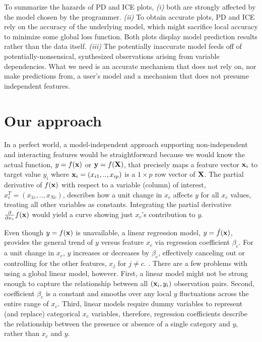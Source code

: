 \documentclass[12pt]{article}
\newcommand{\cut}[1]{}
\begin{document}
To summarize the hazards of PD and ICE plots, {\em (i)} both are strongly affected by the model chosen by the programmer.  {\em (ii)} To obtain accurate plots, PD and ICE rely on the accuracy of the underlying model, which might sacrifice local accuracy to minimize some global loss function.  Both plots display model prediction results rather than the data itself. {\em (iii)} The potentially inaccurate model feeds off of potentially-nonsensical, synthesized observations arising from variable dependencies. What we need is an accurate mechanism that does not rely on, nor make predictions from, a user's model and a mechanism that does not presume independent features.

\section{Our approach}

In a perfect world, a model-independent approach supporting non-independent and interacting features would be straightforward because we would know the actual function, $y = f({\bf x})$ or ${\bf y} = f(\bf X)$, that precisely maps a feature vector ${\bf x}_i$ to target value $y_i$ where ${\bf x}_i = ( x_{i1}, .., x_{ip} )$ is a $1 \times p$ row vector of $\bf X$. The partial derivative of $f({\bf x})$ with respect to a variable (column) of interest, $x_c^T = (x_{1c}, .., x_{Nc})$, describes how a unit change in $x_c$ affects $y$ for all $x_c$ values, treating all other variables as constants. Integrating the partial derivative $\frac{\partial}{\partial x_{c}} f({\bf x})$ would yield a curve showing just $x_{c}$'s contribution to $y$. 

Even though $y = f(\bf x)$ is unavailable, a linear regression model, $y = \hat{f}(\bf x)$, provides the general trend of $y$ versus feature $x_c$ via regression coefficient $\beta_c$. For a unit change in $x_c$, $y$ increases or decreases by $\beta_c$, effectively canceling out or controlling for the other features, $x_{j}$ for $j \neq c$. \cut{(Let $x_{(-c)} = x_j ~\forall~ j \neq c$)}. There are a few problems with using a global linear model, however.  First, a linear model might not be strong enough to capture the relationship between all $({\bf x}_i, y_i)$ observation pairs. Second, coefficient $\beta_c$ is a constant and smooths over any local $y$ fluctuations across the entire range of $x_c$. Third, linear models require dummy variables to represent (and replace) categorical $x_c$ variables, therefore, regression coefficients describe the relationship between the presence or absence of a single category and $y$, rather than $x_c$ and $y$.
\end{document}
